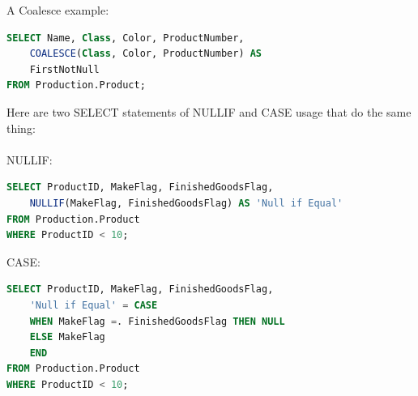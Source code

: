 \documentclass[12pt]{article}
\begin{document}
A Coalesce example:\\
\begin{lstlisting}[language=SQL]
SELECT Name, Class, Color, ProductNumber,
	COALESCE(Class, Color, ProductNumber) AS
	FirstNotNull
FROM Production.Product;
\end{lstlisting}

Here are two SELECT statements of NULLIF and CASE usage that do the same thing:\\
\\
NULLIF:
\begin{lstlisting}[language=SQL]
SELECT ProductID, MakeFlag, FinishedGoodsFlag,
	NULLIF(MakeFlag, FinishedGoodsFlag) AS 'Null if Equal'
FROM Production.Product
WHERE ProductID < 10;
\end{lstlisting}

CASE:
\begin{lstlisting}[language=SQL]
SELECT ProductID, MakeFlag, FinishedGoodsFlag,
	'Null if Equal' = CASE
	WHEN MakeFlag =. FinishedGoodsFlag THEN NULL
	ELSE MakeFlag
	END
FROM Production.Product
WHERE ProductID < 10;
\end{lstlisting}

\newpage
\end{document}
